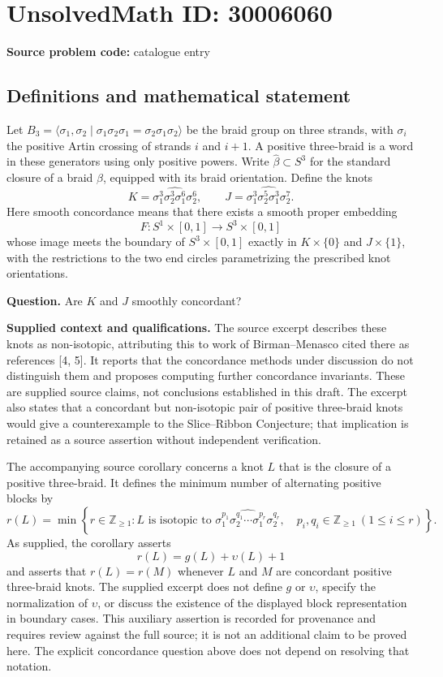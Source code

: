 \documentclass[11pt]{article}
\newcommand{\Z}{\mathbb{Z}}
\begin{document}
\section*{UnsolvedMath ID: 30006060}
\textbf{Source problem code:} catalogue entry
\subsection{Definitions and mathematical statement}
Let \(B_3=\langle \sigma_1,\sigma_2\mid \sigma_1\sigma_2\sigma_1=\sigma_2\sigma_1\sigma_2\rangle\) be the braid group on three strands, with \(\sigma_i\) the positive Artin crossing of strands \(i\) and \(i+1\). A positive three-braid is a word in these generators using only positive powers. Write \(\widehat{\beta}\subset S^3\) for the standard closure of a braid \(\beta\), equipped with its braid orientation. Define the knots
\[
K=\widehat{\sigma_1^3\sigma_2^3\sigma_1^6\sigma_2^6},
\qquad
J=\widehat{\sigma_1^3\sigma_2^5\sigma_1^3\sigma_2^7}.
\]
Here smooth concordance means that there exists a smooth proper embedding
\[
F:S^1\times[0,1]\longrightarrow S^3\times[0,1]
\]
whose image meets the boundary of \(S^3\times[0,1]\) exactly in \(K\times\{0\}\) and \(J\times\{1\}\), with the restrictions to the two end circles parametrizing the prescribed knot orientations.

\textbf{Question.} Are \(K\) and \(J\) smoothly concordant?

\textbf{Supplied context and qualifications.} The source excerpt describes these knots as non-isotopic, attributing this to work of Birman--Menasco cited there as references [4, 5]. It reports that the concordance methods under discussion do not distinguish them and proposes computing further concordance invariants. These are supplied source claims, not conclusions established in this draft. The excerpt also states that a concordant but non-isotopic pair of positive three-braid knots would give a counterexample to the Slice--Ribbon Conjecture; that implication is retained as a source assertion without independent verification.

The accompanying source corollary concerns a knot \(L\) that is the closure of a positive three-braid. It defines the minimum number of alternating positive blocks by
\[
r(L)=\min\left\{r\in\Z_{\geq1}: L\text{ is isotopic to }
\widehat{\sigma_1^{p_1}\sigma_2^{q_1}\cdots\sigma_1^{p_r}\sigma_2^{q_r}},\quad
p_i,q_i\in\Z_{\geq1}\ (1\leq i\leq r)\right\}.
\]
As supplied, the corollary asserts
\[
r(L)=g(L)+\upsilon(L)+1
\]
and asserts that \(r(L)=r(M)\) whenever \(L\) and \(M\) are concordant positive three-braid knots. The supplied excerpt does not define \(g\) or \(\upsilon\), specify the normalization of \(\upsilon\), or discuss the existence of the displayed block representation in boundary cases. This auxiliary assertion is recorded for provenance and requires review against the full source; it is not an additional claim to be proved here. The explicit concordance question above does not depend on resolving that notation.
\end{document}
